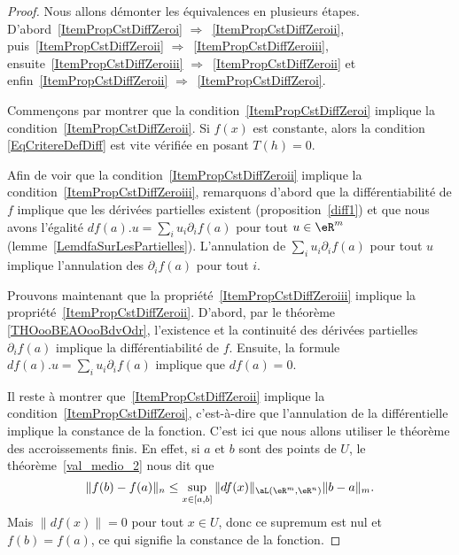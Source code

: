 \begin{proof}
	Nous allons démonter les équivalences en plusieurs étapes. D'abord~\ref{ItemPropCstDiffZeroi} $\Rightarrow$~\ref{ItemPropCstDiffZeroii}, puis~\ref{ItemPropCstDiffZeroii} $\Rightarrow$~\ref{ItemPropCstDiffZeroiii}, ensuite~\ref{ItemPropCstDiffZeroiii} $\Rightarrow$~\ref{ItemPropCstDiffZeroii} et enfin~\ref{ItemPropCstDiffZeroii} $\Rightarrow$~\ref{ItemPropCstDiffZeroi}.

	Commençons par montrer que la condition~\ref{ItemPropCstDiffZeroi} implique la condition~\ref{ItemPropCstDiffZeroii}. Si $f(x)$ est constante, alors la condition \eqref{EqCritereDefDiff} est vite vérifiée en posant $T(h)=0$.

	Afin de voir que la condition~\ref{ItemPropCstDiffZeroii} implique la condition~\ref{ItemPropCstDiffZeroiii}, remarquons d'abord que la différentiabilité de $f$ implique que les dérivées partielles existent (proposition~\ref{diff1}) et que nous avons l'égalité $df(a).u=\sum_iu_i\partial_if(a)$ pour tout $u\in\eR^m$ (lemme~\ref{LemdfaSurLesPartielles}). L'annulation de $\sum_iu_i\partial_if(a)$ pour tout $u$ implique l'annulation des $\partial_if(a)$ pour tout $i$.

    Prouvons maintenant que la propriété~\ref{ItemPropCstDiffZeroiii} implique la propriété~\ref{ItemPropCstDiffZeroii}. D'abord, par le théorème \ref{THOooBEAOooBdvOdr}, l'existence et la continuité des dérivées partielles $\partial_if(a)$ implique la différentiabilité de $f$. Ensuite, la formule $df(a).u=\sum_i u_i\partial_if(a)$ implique que $df(a)=0$.


	Il reste à montrer que~\ref{ItemPropCstDiffZeroii} implique la condition~\ref{ItemPropCstDiffZeroi}, c'est-à-dire que l'annulation de la différentielle implique la constance de la fonction. C'est ici que nous allons utiliser le théorème des accroissements finis. En effet, si $a$ et $b$ sont des points de $U$, le théorème~\ref{val_medio_2} nous dit que
	\begin{equation}
		\|f(b)-f(a)\|_n\leq \sup_{x\in[a,b]}\|df(x)\|_{\aL(\eR^m,\eR^n)}\|b-a\|_m.
	\end{equation}
	Mais $\| df(x) \|=0$ pour tout $x\in U$, donc ce supremum est nul et $f(b)=f(a)$, ce qui signifie la constance de la fonction.
\end{proof}


